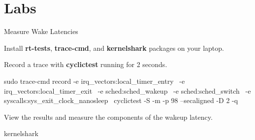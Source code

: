 \clearpage\section{Labs}\begin{Lab}

\begin{exe} {Measure Wake Latencies}

   Install \textbf{rt-tests}, \textbf{trace-cmd}, and
   \textbf{kernelshark} packages on your laptop.

   Record a trace with \textbf{cyclictest} running for 2 seconds.
   \begin{raw}
sudo trace-cmd record -e irq_vectors:local_timer_entry \
                      -e irq_vectors:local_timer_exit \
                      -e sched:sched_wakeup \
                      -e sched:sched_switch \
                      -e syscalls:sys_exit_clock_nanosleep \
                      cyclictest -S -m -p 98 --secaligned -D 2 -q
   \end{raw}

   View the results and measure the components of the wakeup latency.
   \begin{raw}
kernelshark
   \end{raw}
\end{exe}

\end{Lab}
